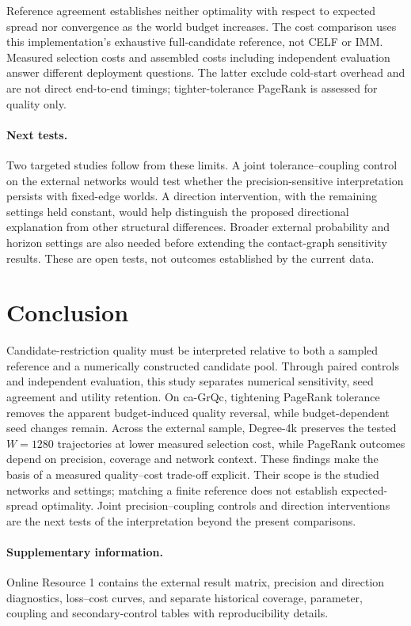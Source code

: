 \documentclass[smallextended]{svjour3}
\begin{document}
Reference agreement establishes neither optimality with respect to expected spread nor convergence as the world budget increases. The cost comparison uses this implementation's exhaustive full-candidate reference, not CELF or IMM. Measured selection costs and assembled costs including independent evaluation answer different deployment questions. The latter exclude cold-start overhead and are not direct end-to-end timings; tighter-tolerance PageRank is assessed for quality only.

\paragraph{Next tests.} Two targeted studies follow from these limits. A joint tolerance--coupling control on the external networks would test whether the precision-sensitive interpretation persists with fixed-edge worlds. A direction intervention, with the remaining settings held constant, would help distinguish the proposed directional explanation from other structural differences. Broader external probability and horizon settings are also needed before extending the contact-graph sensitivity results. These are open tests, not outcomes established by the current data.

\section{Conclusion}
Candidate-restriction quality must be interpreted relative to both a sampled reference and a numerically constructed candidate pool. Through paired controls and independent evaluation, this study separates numerical sensitivity, seed agreement and utility retention. On ca-GrQc, tightening PageRank tolerance removes the apparent budget-induced quality reversal, while budget-dependent seed changes remain. Across the external sample, Degree-4k preserves the tested $W=1280$ trajectories at lower measured selection cost, while PageRank outcomes depend on precision, coverage and network context. These findings make the basis of a measured quality--cost trade-off explicit. Their scope is the studied networks and settings; matching a finite reference does not establish expected-spread optimality. Joint precision--coupling controls and direction interventions are the next tests of the interpretation beyond the present comparisons.

\paragraph{Supplementary information.} Online Resource 1 contains the external result matrix, precision and direction diagnostics, loss--cost curves, and separate historical coverage, parameter, coupling and secondary-control tables with reproducibility details.
\end{document}
